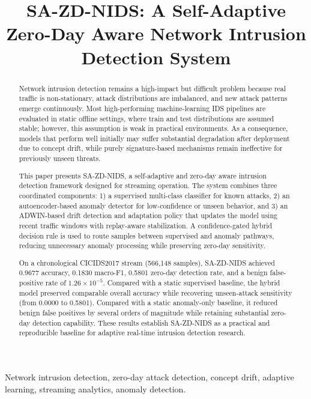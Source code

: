 \documentclass[conference]{IEEEtran}
\title{SA-ZD-NIDS: A Self-Adaptive Zero-Day Aware Network Intrusion Detection System}
\author{
\IEEEauthorblockN{Mehul Gupta, Bhavishya Jain}
\IEEEauthorblockA{Manipal University Jaipur}
}
\begin{document}
\maketitle

\begin{abstract}
Network intrusion detection remains a high-impact but difficult problem because real traffic is non-stationary, attack distributions are imbalanced, and new attack patterns emerge continuously. Most high-performing machine-learning IDS pipelines are evaluated in static offline settings, where train and test distributions are assumed stable; however, this assumption is weak in practical environments. As a consequence, models that perform well initially may suffer substantial degradation after deployment due to concept drift, while purely signature-based mechanisms remain ineffective for previously unseen threats.  

This paper presents SA-ZD-NIDS, a self-adaptive and zero-day aware intrusion detection framework designed for streaming operation. The system combines three coordinated components: 1) a supervised multi-class classifier for known attacks, 2) an autoencoder-based anomaly detector for low-confidence or unseen behavior, and 3) an ADWIN-based drift detection and adaptation policy that updates the model using recent traffic windows with replay-aware stabilization. A confidence-gated hybrid decision rule is used to route samples between supervised and anomaly pathways, reducing unnecessary anomaly processing while preserving zero-day sensitivity.  

On a chronological CICIDS2017 stream (566,148 samples), SA-ZD-NIDS achieved 0.9677 accuracy, 0.1830 macro-F1, 0.5801 zero-day detection rate, and a benign false-positive rate of $1.26\times10^{-5}$. Compared with a static supervised baseline, the hybrid model preserved comparable overall accuracy while recovering unseen-attack sensitivity (from 0.0000 to 0.5801). Compared with a static anomaly-only baseline, it reduced benign false positives by several orders of magnitude while retaining substantial zero-day detection capability. These results establish SA-ZD-NIDS as a practical and reproducible baseline for adaptive real-time intrusion detection research.
\end{abstract}

\begin{IEEEkeywords}
Network intrusion detection, zero-day attack detection, concept drift, adaptive learning, streaming analytics, anomaly detection.
\end{IEEEkeywords}
\end{document}
